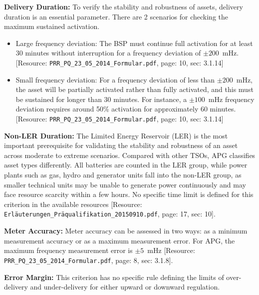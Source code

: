 \textbf{Delivery Duration:} To verify the stability and robustness of assets, delivery duration is an essential parameter. There are 2 scenarios for checking the maximum sustained activation.
\begin{itemize}
    \item Large frequency deviation: The BSP must continue full activation for at least 30 minutes without interruption for a frequency deviation of $\pm 200$~mHz. [Resource: \texttt{PRR\_PQ\_23\_05\_2014\_Formular.pdf}, page: 10, sec: 3.1.14]
    \item Small frequency deviation: For a frequency deviation of less than $\pm 200$~mHz, the asset will be partially activated rather than fully activated, and this must be sustained for longer than 30 minutes. For instance, a $\pm 100$~mHz frequency deviation requires around 50\% activation for approximately 60 minutes. [Resource: \texttt{PRR\_PQ\_23\_05\_2014\_Formular.pdf}, page: 10, sec: 3.1.14]
\end{itemize}
\textbf{Non-LER Duration:} The Limited Energy Reservoir (LER) is the most important prerequisite for validating the stability and robustness of an asset across moderate to extreme scenarios. Compared with other TSOs, APG classifies asset types differently. All batteries are counted in the LER group, while power plants such as gas, hydro and generator units fall into the non-LER group, as smaller technical units may be unable to generate power continuously and may face resource scarcity within a few hours. No specific time limit is defined for this criterion in the available resources [Resource: \texttt{Erläuterungen\_Präqualifikation\_20150910.pdf}, page: 17, sec: 10].

\textbf{Meter Accuracy:} Meter accuracy can be assessed in two ways: as a minimum measurement accuracy or as a maximum measurement error. For APG, the maximum frequency measurement error is $\pm 5$~mHz [Resource: \texttt{PRR\_PQ\_23\_05\_2014\_Formular.pdf}, page: 8, sec: 3.1.8].

\textbf{Error Margin:} This criterion has no specific rule defining the limits of over-delivery and under-delivery for either upward or downward regulation.

